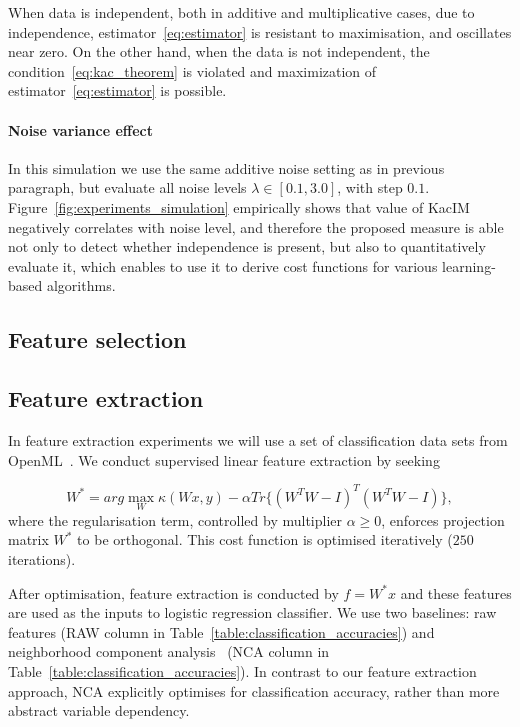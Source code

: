 \documentclass{article}
\begin{document}
When data is independent, both in additive and multiplicative cases, due to independence, estimator~\eqref{eq:estimator} is resistant to maximisation, and oscillates near zero. On the other hand, when the data is not independent, the condition~\eqref{eq:kac_theorem} is violated and maximization of estimator~\eqref{eq:estimator} is possible.
\paragraph{Noise variance effect} In this simulation we use the same additive noise setting as in previous paragraph, but evaluate all noise levels $\lambda \in [0.1, 3.0]$, with step $0.1$.
Figure~\ref{fig:experiments_simulation} empirically shows that value of KacIM  negatively correlates with noise level, and therefore the proposed measure is able not only to detect whether independence is present, but also to quantitatively evaluate it, which enables to use it to derive cost functions for various learning-based algorithms. 



\subsection{Feature selection}

\subsection{Feature extraction}
In feature extraction experiments we will use a set of classification data sets from OpenML~\cite{OpenML2013}.  We conduct supervised linear feature extraction by seeking 

\begin{equation}
\label{eq:kim_feature_extraction}    
W^{*} = arg \max_{W} \kappa(Wx, y) - \alpha Tr\{(W^{T}W-I)^{T}(W^{T}W-I) \},
\end{equation}
where the regularisation term, controlled by multiplier $\alpha \geq 0$, enforces projection matrix $W^{*}$ to be orthogonal. This cost function is optimised iteratively ($250$ iterations).


\noindent After optimisation, feature extraction is conducted by $f = W^{*}x$ and these features are used as the inputs to logistic regression classifier.
We use two baselines: raw features (RAW column in Table~\ref{table:classification_accuracies}) and neighborhood component analysis~\cite{NIPS2004_42fe8808} (NCA column in Table~\ref{table:classification_accuracies}). In contrast to our feature extraction approach, NCA explicitly optimises for classification accuracy, rather than more abstract variable dependency.
\end{document}
